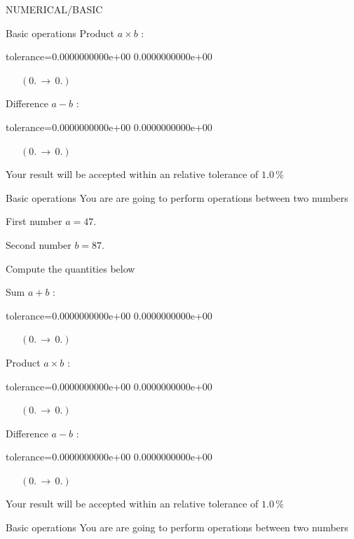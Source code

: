 \documentclass[12pt]{article}
\begin{document}
\begin{quiz}{NUMERICAL/BASIC}
\begin{cloze}{Basic operations}
Product $ a \times b $ : 
\begin{numerical}[points=1] 
\item[tolerance={0.0000000000e+00}] 0.0000000000e+00 
\end{numerical} 
 $\,$ 
 $ \quad (0. \, \rightarrow \, 0.) $ 

Difference $ a - b $ : 
\begin{numerical}[points=1] 
\item[tolerance={0.0000000000e+00}] 0.0000000000e+00 
\end{numerical} 
 $\,$ 
 $ \quad (0. \, \rightarrow \, 0.) $ 

Your result will be accepted within an relative tolerance of $1.0\, \% $

\end{cloze} 


 \begin{cloze}{Basic operations} 
You are are going to perform operations between two numbers

First number $a = 47.\, $

Second number $b = 87.\, $

 

Compute the quantities below

Sum $ a + b $ : 
\begin{numerical}[points=1] 
\item[tolerance={0.0000000000e+00}] 0.0000000000e+00 
\end{numerical} 
 $\,$ 
 $ \quad (0. \, \rightarrow \, 0.) $ 

Product $ a \times b $ : 
\begin{numerical}[points=1] 
\item[tolerance={0.0000000000e+00}] 0.0000000000e+00 
\end{numerical} 
 $\,$ 
 $ \quad (0. \, \rightarrow \, 0.) $ 

Difference $ a - b $ : 
\begin{numerical}[points=1] 
\item[tolerance={0.0000000000e+00}] 0.0000000000e+00 
\end{numerical} 
 $\,$ 
 $ \quad (0. \, \rightarrow \, 0.) $ 

Your result will be accepted within an relative tolerance of $1.0\, \% $

\end{cloze} 


 \begin{cloze}{Basic operations} 
You are are going to perform operations between two numbers


\end{cloze}
\end{quiz}
\end{document}
